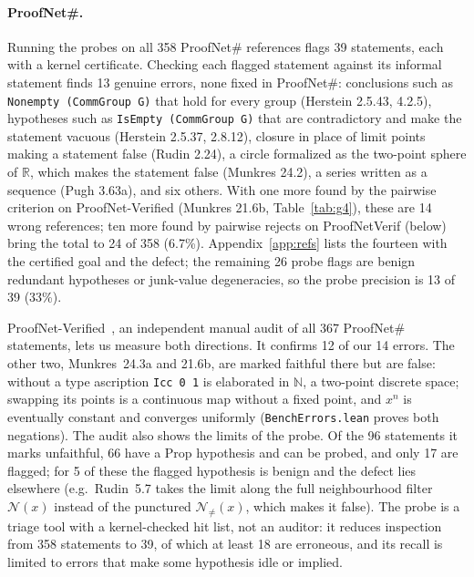 \documentclass[10pt]{article}
\theoremstyle{definition}
\begin{document}
\paragraph{ProofNet\#.} Running the probes on all 358 ProofNet\# references
flags 39 statements, each with a kernel certificate. Checking each flagged statement against
its informal statement finds 13 genuine errors, none fixed in ProofNet\#: conclusions such as
\texttt{Nonempty (CommGroup G)} that hold for every group (Herstein 2.5.43, 4.2.5), hypotheses
such as \texttt{IsEmpty (CommGroup G)} that are contradictory and make the statement vacuous
(Herstein 2.5.37, 2.8.12), closure in place of limit points making a statement false (Rudin
2.24), a circle formalized as the two-point sphere of $\mathbb R$, which makes the
statement false (Munkres 24.2), a series written as a sequence (Pugh 3.63a), and six others.
With one more found by the pairwise criterion on ProofNet-Verified (Munkres 21.6b,
Table~\ref{tab:g4}), these are 14 wrong references; ten more found by pairwise rejects on
ProofNetVerif (below) bring the total to 24 of 358 (6.7\%). Appendix~\ref{app:refs} lists the
fourteen with the certified goal and the defect; the remaining 26 probe flags are benign
redundant hypotheses or junk-value degeneracies, so the probe precision is 13 of 39 (33\%).

ProofNet-Verified~\cite{pnv}, an independent manual audit of all 367 ProofNet\# statements,
lets us measure both directions. It confirms 12 of our 14 errors. The other two,
Munkres~24.3a and 21.6b, are marked faithful there but are false: without a type ascription
\texttt{Icc 0 1} is elaborated in $\mathbb N$, a two-point discrete space; swapping its points
is a continuous map without a fixed point, and $x^n$ is eventually constant and converges
uniformly (\texttt{BenchErrors.lean} proves both negations). The
audit also shows the limits of the probe. Of the 96 statements it marks unfaithful, 66 have a
Prop hypothesis and can be probed, and only 17 are flagged; for 5 of these the flagged
hypothesis is benign and the defect lies elsewhere (e.g.\ Rudin~5.7 takes the limit along
the full neighbourhood filter $\mathcal N(x)$ instead of the punctured $\mathcal N_{\ne}(x)$, which
makes it false). The probe is a triage tool with a kernel-checked hit list, not an
auditor: it reduces inspection from 358 statements to 39, of which at least 18 are erroneous,
and its recall is limited to errors that make some hypothesis idle or implied.
\end{document}
